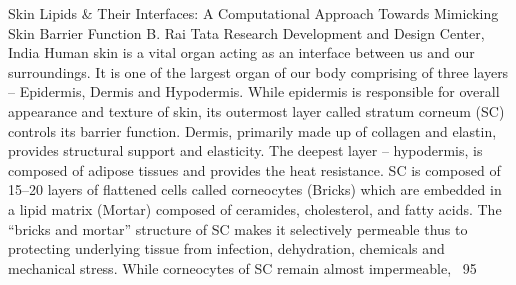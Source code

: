 
    \begin{abstract_online}{Skin Lipids & Their Interfaces: A Computational Approach Towards Mimicking Skin Barrier Function }{%
        B. Rai}{%
        \IStag}{%
        Tata Research Development and Design Center, India}
    Human skin is a vital organ acting as an interface between us and our surroundings. It is one of the largest organ of our body comprising of three layers – Epidermis, Dermis and Hypodermis. While epidermis is responsible for overall appearance and texture of skin, its outermost layer called stratum corneum (SC) controls its barrier function. Dermis, primarily made up of collagen and elastin, provides structural support and elasticity. The deepest layer – hypodermis, is composed of adipose tissues and provides the heat resistance.  SC is composed of 15–20 layers of flattened cells called corneocytes (Bricks) which are embedded in a lipid matrix (Mortar) composed of ceramides, cholesterol, and fatty acids. The “bricks and mortar” structure of SC makes it selectively permeable thus to protecting underlying tissue from infection, dehydration, chemicals and mechanical stress. While corneocytes of SC remain almost impermeable, ~95%
    
    \end{abstract_online}
    